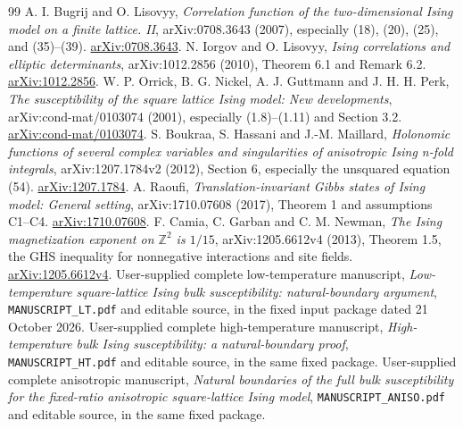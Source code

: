 \documentclass[11pt]{article}
\numberwithin{equation}{section}
\theoremstyle{definition}
\begin{document}
\begin{thebibliography}{99}
 A. I. Bugrij and O. Lisovyy,
\emph{Correlation function of the two-dimensional Ising model on a
finite lattice. II}, arXiv:0708.3643 (2007), especially
(18), (20), (25), and (35)--(39).
\href{https://arxiv.org/abs/0708.3643}{arXiv:0708.3643}.
 N. Iorgov and O. Lisovyy,
\emph{Ising correlations and elliptic determinants},
arXiv:1012.2856 (2010), Theorem 6.1 and Remark 6.2.
\href{https://arxiv.org/abs/1012.2856}{arXiv:1012.2856}.
 W. P. Orrick, B. G. Nickel, A. J. Guttmann and J. H. H. Perk,
\emph{The susceptibility of the square lattice Ising model: New developments},
arXiv:cond-mat/0103074 (2001), especially (1.8)--(1.11) and Section 3.2.
\href{https://arxiv.org/abs/cond-mat/0103074}{arXiv:cond-mat/0103074}.
 S. Boukraa, S. Hassani and J.-M. Maillard,
\emph{Holonomic functions of several complex variables and singularities
of anisotropic Ising n-fold integrals}, arXiv:1207.1784v2 (2012),
Section 6, especially the unsquared equation (54).
\href{https://arxiv.org/abs/1207.1784}{arXiv:1207.1784}.
 A. Raoufi,
\emph{Translation-invariant Gibbs states of Ising model: General setting},
arXiv:1710.07608 (2017), Theorem 1 and assumptions C1--C4.
\href{https://arxiv.org/abs/1710.07608}{arXiv:1710.07608}.
 F. Camia, C. Garban and C. M. Newman,
\emph{The Ising magnetization exponent on \(\mathbb Z^2\) is \(1/15\)},
arXiv:1205.6612v4 (2013), Theorem 1.5, the GHS inequality for
nonnegative interactions and site fields.
\href{https://arxiv.org/abs/1205.6612v4}{arXiv:1205.6612v4}.
 User-supplied complete low-temperature manuscript,
\emph{Low-temperature square-lattice Ising bulk susceptibility:
natural-boundary argument}, \texttt{MANUSCRIPT\_LT.pdf} and editable source,
in the fixed input package dated 21 October 2026.
 User-supplied complete high-temperature manuscript,
\emph{High-temperature bulk Ising susceptibility: a natural-boundary proof},
\texttt{MANUSCRIPT\_HT.pdf} and editable source, in the same fixed package.
 User-supplied complete anisotropic manuscript,
\emph{Natural boundaries of the full bulk susceptibility for the
fixed-ratio anisotropic square-lattice Ising model},
\texttt{MANUSCRIPT\_ANISO.pdf} and editable source, in the same fixed package.
\end{thebibliography}
\end{document}
